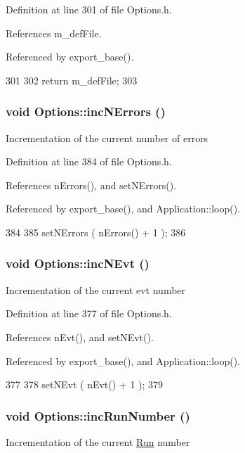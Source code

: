 Definition at line 301 of file Options.h.

References m\_\-defFile.

Referenced by export\_\-base().


\begin{DoxyCode}
301                              {
302                 return m_defFile;
303         }
\end{DoxyCode}
\hypertarget{classOptions_ae5d12fb2571255033ef6b35300921b39}{
\subsubsection[{incNErrors}]{\setlength{\rightskip}{0pt plus 5cm}void Options::incNErrors ()}}
\label{classOptions_ae5d12fb2571255033ef6b35300921b39}
Incrementation of the current number of errors 

Definition at line 384 of file Options.h.

References nErrors(), and setNErrors().

Referenced by export\_\-base(), and Application::loop().


\begin{DoxyCode}
384                           {
385                 setNErrors ( nErrors() + 1 );
386         }
\end{DoxyCode}
\hypertarget{classOptions_aa950f9861182c76c4005668e0b7f012a}{
\subsubsection[{incNEvt}]{\setlength{\rightskip}{0pt plus 5cm}void Options::incNEvt ()}}
\label{classOptions_aa950f9861182c76c4005668e0b7f012a}
Incrementation of the current evt number 

Definition at line 377 of file Options.h.

References nEvt(), and setNEvt().

Referenced by export\_\-base(), and Application::loop().


\begin{DoxyCode}
377                        {
378                 setNEvt ( nEvt() + 1 );
379         }
\end{DoxyCode}
\hypertarget{classOptions_a0bf512fc9126cd76acabaa4c3b65d7fb}{
\subsubsection[{incRunNumber}]{\setlength{\rightskip}{0pt plus 5cm}void Options::incRunNumber ()}}
\label{classOptions_a0bf512fc9126cd76acabaa4c3b65d7fb}
Incrementation of the current \hyperlink{classRun}{Run} number 


